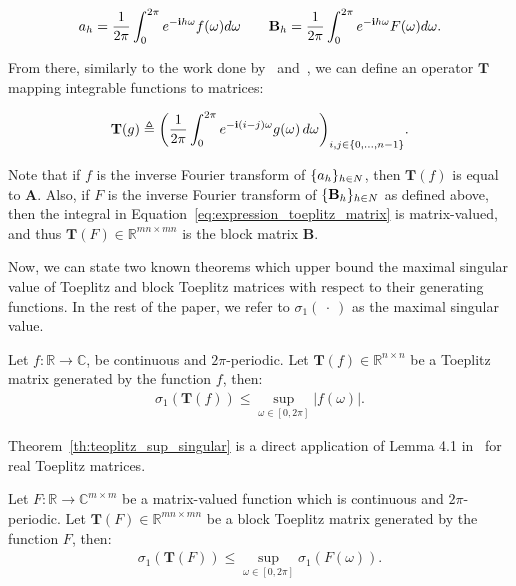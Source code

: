 \begin{equation}
    a_h = \frac{1}{2\pi} \int_0^{2\pi} e^{-\mathbf{i} h \omega} f(\omega) d\omega \quad \quad \mathbf{B}_h = \frac{1}{2\pi} \int_0^{2\pi} e^{-\mathbf{i} h \omega} F(\omega) d\omega .
\end{equation}

From there, similarly to the work done by~\cite{gray2006toeplitz} and~\cite{gutierrez2012block}, we can define an operator $\mathbf{T}$ mapping integrable functions to matrices:

\begin{equation}
  \mathbf{T}(g)  \triangleq\leftmat\frac{1}{2\pi}\int_{0}^{2\pi}e^{-\ci(i-j)\omega}g(\omega)\,d\omega\rightmat_{i,j\in\{0,\ldots,n-1\}} . \label{eq:expression_toeplitz_matrix}
\end{equation}

Note that if $f$ is the inverse Fourier transform of $\{a_h\}_{h \in N}$, then $\mathbf{T}(f)$ is equal to $\mathbf{A}$.
Also, if $F$ is the inverse Fourier transform of $\{\mathbf B_h\}_{h \in N}$ as defined above, then the integral in Equation~\ref{eq:expression_toeplitz_matrix} is matrix-valued, and thus $\mathbf{T}(F) \in \mathbb{R}^{mn \times mn}$ is the block matrix $\mathbf{B}$.

Now, we can state two known theorems which upper bound the maximal singular value of Toeplitz and block Toeplitz matrices with respect to their generating functions.
In the rest of the paper, we refer to $\sigma_1(\ \cdot\ )$ as the maximal singular value. 

\begin{theorem} \label{th:teoplitz_sup_singular}
Let $f: \mathbb{R} \rightarrow \mathbb{C}$, be continuous and $2\pi$-periodic. Let $\mathbf{T}(f) \in \mathbb{R}^{n \times n}$ be a Toeplitz matrix generated by the function $f$, then:
\begin{align}
  \sigma_1 \left( \mathbf{T}(f) \right) \leq \sup_{\omega \in [0, 2\pi]} |f(\omega)|.
\end{align}
\end{theorem}

Theorem~\ref{th:teoplitz_sup_singular} is a direct application of  Lemma 4.1 in~\cite{gray2006toeplitz} for real Toeplitz matrices. 
\begin{theorem} \label{th:block_teoplitz_sup_singular}
Let $F: \mathbb{R} \rightarrow \mathbb{C}^{m \times m}$ be a matrix-valued function which is continuous and $2 \pi$-periodic.
Let $\mathbf{T}(F) \in \mathbb{R}^{mn \times mn}$ be a block Toeplitz matrix generated by the function $F$, then:
\begin{align}
  \sigma_1 \left( \mathbf{T}(F) \right) \leq \sup_{\omega \in [0, 2\pi]} \sigma_1 \left( F\left( \omega \right) \right) .
\end{align}
\end{theorem}

